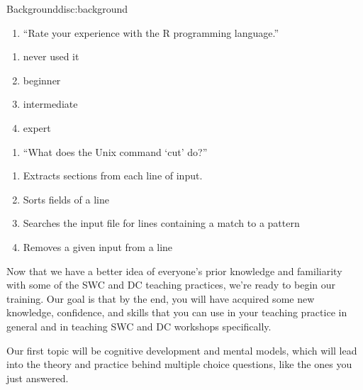 \begin{discussion}{Background}{disc:background}
\begin{enumerate}
\def\labelenumi{\arabic{enumi}.}
\setcounter{enumi}{2}
\itemsep1pt\parskip0pt
\item
  ``Rate your experience with the R programming language.''
\end{enumerate}

\begin{enumerate}
\def\labelenumi{(\alph{enumi})}
\itemsep1pt\parskip0pt
\item
  never used it
\item
  beginner
\item
  intermediate
\item
  expert
\end{enumerate}

\begin{enumerate}
\def\labelenumi{\arabic{enumi}.}
\setcounter{enumi}{3}
\itemsep1pt\parskip0pt
\item
  ``What does the Unix command `cut' do?''
\end{enumerate}

\begin{enumerate}
\def\labelenumi{(\alph{enumi})}
\itemsep1pt\parskip0pt
\item
  Extracts sections from each line of input.
\item
  Sorts fields of a line
\item
  Searches the input file for lines containing a match to a pattern
\item
  Removes a given input from a line
\end{enumerate}

\end{discussion}

Now that we have a better idea of everyone's prior knowledge and
familiarity with some of the SWC and DC teaching practices, we're ready
to begin our training. Our goal is that by the end, you will have
acquired some new knowledge, confidence, and skills that you can use in
your teaching practice in general and in teaching SWC and DC workshops
specifically.

Our first topic will be cognitive development and mental models, which
will lead into the theory and practice behind multiple choice questions,
like the ones you just answered.
